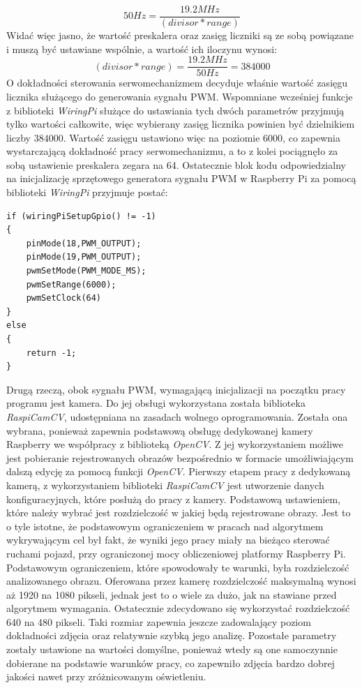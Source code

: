 \begin{equation}
50 Hz = \frac{19.2 MHz}{(divisor * range)}
\label{eq:hard_pwmN}
\end{equation}
Widać więc jasno, że wartość preskalera oraz zasięg liczniki są ze sobą powiązane i muszą być ustawiane wspólnie, a wartość ich iloczynu wynosi:
\begin{equation}
(divisor * range) = \frac{19.2 MHz}{50 Hz} = 384000
\label{eq:range_x_presc}
\end{equation}
O dokładności sterowania serwomechanizmem decyduje właśnie wartość zasięgu licznika służącego do generowania sygnału PWM. Wspomniane wcześniej funkcje z biblioteki \textit{WiringPi} służące do ustawiania tych dwóch parametrów przyjmują tylko wartości całkowite, więc wybierany zasięg licznika powinien być dzielnikiem liczby $384000$. Wartość zasięgu ustawiono więc na poziomie 6000, co zapewnia wystarczającą dokładność pracy serwomechanizmu, a to z kolei pociągnęło za sobą ustawienie preskalera zegara na 64. Ostatecznie blok kodu odpowiedzialny na inicjalizację sprzętowego generatora sygnału PWM w Raspberry Pi za pomocą biblioteki \textit{WiringPi} przyjmuje postać:
\begin{lstlisting}[caption=Inicjalizacja sygnałów PWM]
if (wiringPiSetupGpio() != -1)
{
	pinMode(18,PWM_OUTPUT);
	pinMode(19,PWM_OUTPUT);
	pwmSetMode(PWM_MODE_MS);
	pwmSetRange(6000);
	pwmSetClock(64)
}
else
{
	return -1;
}
\end{lstlisting}

Drugą rzeczą, obok sygnału PWM, wymagającą inicjalizacji na początku pracy programu jest kamera. Do jej obsługi wykorzystana została biblioteka \textit{RaspiCamCV}, udostępniana na zasadach wolnego oprogramowania. Została ona wybrana, ponieważ zapewnia podstawową obsługę dedykowanej kamery Raspberry we współpracy z biblioteką \textit{OpenCV}. Z jej wykorzystaniem możliwe jest pobieranie rejestrowanych obrazów bezpośrednio w formacie umożliwiającym dalszą edycję za pomocą funkcji \textit{OpenCV}. Pierwszy etapem pracy z dedykowaną kamerą, z wykorzystaniem biblioteki \textit{RaspiCamCV} jest utworzenie danych konfiguracyjnych, które posłużą do pracy z kamery. Podstawową ustawieniem, które należy wybrać jest rozdzielczość w jakiej będą rejestrowane obrazy. Jest to o tyle istotne, że podstawowym ograniczeniem w pracach nad algorytmem wykrywającym cel był fakt, że wyniki jego pracy miały na bieżąco sterować ruchami pojazd, przy ograniczonej mocy obliczeniowej platformy Raspberry Pi. Podstawowym ograniczeniem, które spowodowały te warunki, była rozdzielczość analizowanego obrazu. Oferowana przez kamerę rozdzielczość maksymalną wynosi aż 1920 na 1080 pikseli, jednak jest to o wiele za dużo, jak na stawiane przed algorytmem wymagania. Ostatecznie zdecydowano się wykorzystać rozdzielczość 640 na 480 pikseli. Taki rozmiar zapewnia jeszcze zadowalający poziom dokładności zdjęcia oraz relatywnie szybką jego analizę. Pozostałe parametry zostały ustawione na wartości domyślne, ponieważ wtedy są one samoczynnie dobierane na podstawie warunków pracy, co zapewniło zdjęcia bardzo dobrej jakości nawet przy zróżnicowanym oświetleniu.

